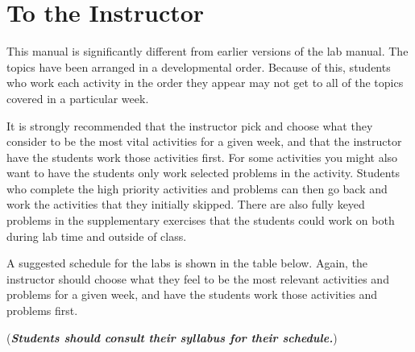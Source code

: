 \documentclass[10pt,oneside,]{book}
\newcommand{\alert}[1]{\textbf{\textit{#1}}}
\theoremstyle{plain}
\theoremstyle{definition}
\numberwithin{equation}{section}
\begin{document}
\chapter*{To the Instructor}\label{to-the-instructor}
This manual is significantly different from earlier versions of the lab manual. The topics have been arranged in a developmental order. Because of this, students who work each activity in the order they appear may not get to all of the topics covered in a particular week.%
\par
It is strongly recommended that the instructor pick and choose what they consider to be the most vital activities for a given week, and that the instructor have the students work those activities first. For some activities you might also want to have the students only work selected problems in the activity. Students who complete the high priority activities and problems can then go back and work the activities that they initially skipped. There are also fully keyed problems in the supplementary exercises that the students could work on both during lab time and outside of class.%
\par
A suggested schedule for the labs is shown in the table below. Again, the instructor should choose what they feel to be the most relevant activities and problems for a given week, and have the students work those activities and problems first.%
\par
(\alert{Students should consult their syllabus for their schedule.})%
\end{document}
